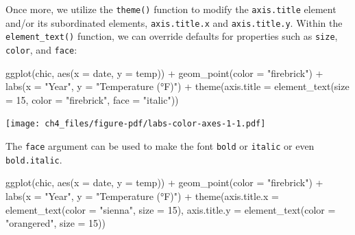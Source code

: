 \documentclass[
  letterpaper,
  DIV=11,
  numbers=noendperiod]{scrreprt}
\newenvironment{Shaded}{\begin{snugshade}}{\end{snugshade}}
\newcommand{\AttributeTok}[1]{\textcolor[rgb]{0.40,0.45,0.13}{#1}}
\newcommand{\DecValTok}[1]{\textcolor[rgb]{0.68,0.00,0.00}{#1}}
\newcommand{\FunctionTok}[1]{\textcolor[rgb]{0.28,0.35,0.67}{#1}}
\newcommand{\NormalTok}[1]{\textcolor[rgb]{0.00,0.23,0.31}{#1}}
\newcommand{\SpecialCharTok}[1]{\textcolor[rgb]{0.37,0.37,0.37}{#1}}
\newcommand{\StringTok}[1]{\textcolor[rgb]{0.13,0.47,0.30}{#1}}
\begin{document}
Once more, we utilize the \texttt{theme()} function to modify the
\texttt{axis.title} element and/or its subordinated elements,
\texttt{axis.title.x} and \texttt{axis.title.y}. Within the
\texttt{element\_text()} function, we can override defaults for
properties such as \texttt{size}, \texttt{color}, and \texttt{face}:

\begin{Shaded}
\begin{Highlighting}[]
\FunctionTok{ggplot}\NormalTok{(chic, }\FunctionTok{aes}\NormalTok{(}\AttributeTok{x =}\NormalTok{ date, }\AttributeTok{y =}\NormalTok{ temp)) }\SpecialCharTok{+}
  \FunctionTok{geom\_point}\NormalTok{(}\AttributeTok{color =} \StringTok{"firebrick"}\NormalTok{) }\SpecialCharTok{+}
  \FunctionTok{labs}\NormalTok{(}\AttributeTok{x =} \StringTok{"Year"}\NormalTok{, }\AttributeTok{y =} \StringTok{"Temperature (°F)"}\NormalTok{) }\SpecialCharTok{+}
  \FunctionTok{theme}\NormalTok{(}\AttributeTok{axis.title =} \FunctionTok{element\_text}\NormalTok{(}\AttributeTok{size =} \DecValTok{15}\NormalTok{, }\AttributeTok{color =} \StringTok{"firebrick"}\NormalTok{,}
                                  \AttributeTok{face =} \StringTok{"italic"}\NormalTok{))}
\end{Highlighting}
\end{Shaded}

\texttt{[image: ch4\_files/figure-pdf/labs-color-axes-1-1.pdf]}

The \texttt{face} argument can be used to make the font \texttt{bold} or
\texttt{italic} or even \texttt{bold.italic}.

\begin{Shaded}
\begin{Highlighting}[]
\FunctionTok{ggplot}\NormalTok{(chic, }\FunctionTok{aes}\NormalTok{(}\AttributeTok{x =}\NormalTok{ date, }\AttributeTok{y =}\NormalTok{ temp)) }\SpecialCharTok{+}
  \FunctionTok{geom\_point}\NormalTok{(}\AttributeTok{color =} \StringTok{"firebrick"}\NormalTok{) }\SpecialCharTok{+}
  \FunctionTok{labs}\NormalTok{(}\AttributeTok{x =} \StringTok{"Year"}\NormalTok{, }\AttributeTok{y =} \StringTok{"Temperature (°F)"}\NormalTok{) }\SpecialCharTok{+}
  \FunctionTok{theme}\NormalTok{(}\AttributeTok{axis.title.x =} \FunctionTok{element\_text}\NormalTok{(}\AttributeTok{color =} \StringTok{"sienna"}\NormalTok{, }\AttributeTok{size =} \DecValTok{15}\NormalTok{),}
        \AttributeTok{axis.title.y =} \FunctionTok{element\_text}\NormalTok{(}\AttributeTok{color =} \StringTok{"orangered"}\NormalTok{, }\AttributeTok{size =} \DecValTok{15}\NormalTok{))}
\end{Highlighting}
\end{Shaded}
\end{document}

